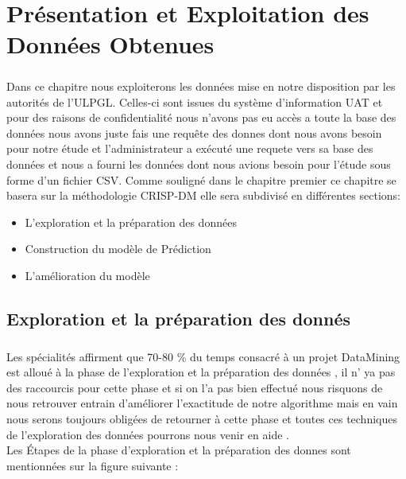 \chapter{Présentation et Exploitation des Données Obtenues}
\paragraph{}
 Dans ce chapitre nous exploiterons  les données mise en notre
disposition par les autorités de l'\ac{ULPGL}. Celles-ci sont issues du
système d'information \ac{UAT}  et pour des
raisons de confidentialité nous n'avons pas eu accès a toute la base des
données nous avons juste fais une requête des donnes dont nous avons
besoin pour notre étude et l'administrateur a exécuté une requete vers
sa base des données et nous a fourni les données dont nous avions besoin
pour l'étude sous forme d'un fichier \ac {CSV}. Comme
souligné dans le chapitre premier ce chapitre se basera sur la
méthodologie \ac{CRISP-DM} elle sera subdivisé en différentes sections:
\begin{itemize}
	\item L'exploration et la préparation des données 
	\item  Construction du modèle de Prédiction  
	\item  L'amélioration du modèle  \cite{bookSckit-Learn}
\end{itemize}


    \section{Exploration et la préparation des donnés}
\paragraph{}
Les spécialités affirment que 70-80 \% du temps consacré à un projet
DataMining est alloué à la phase de l'exploration et la préparation des
données \cite{DataExpAV} , il n' ya pas des raccourcis pour cette phase et si on l'a pas
bien effectué nous risquons de nous retrouver entrain d'améliorer
l'exactitude de notre algorithme mais en vain nous serons toujours
obligées de retourner à cette phase et toutes ces techniques de
l'exploration des données pourrons nous venir en aide .\\
Les Étapes de la phase d'exploration et la préparation des donnes sont mentionnées sur la figure suivante :
